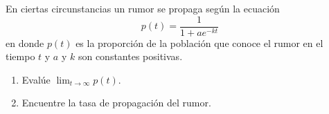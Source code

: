 \item En ciertas circunstancias un rumor se propaga según la ecuación
$$p(t) = \frac{1}{1 + ae^{-kt}}$$
en donde $p(t)$ es la proporción de la población que conoce el rumor en el tiempo $t$ y $a$ y $k$ son constantes positivas.
\begin{enumerate}
    \item[(a)] Evalúe $\lim_{t \to \infty} p(t)$.
    \item[(b)] Encuentre la tasa de propagación del rumor.
\end{enumerate}
